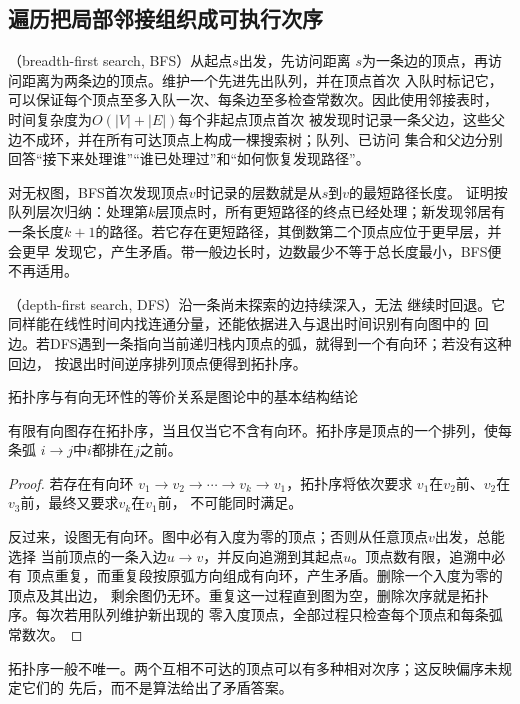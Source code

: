 \subsection{遍历把局部邻接组织成可执行次序}

（breadth-first search, BFS）从起点\(s\)出发，先访问距离
\(s\)为一条边的顶点，再访问距离为两条边的顶点。维护一个先进先出队列，并在顶点首次
入队时标记它，可以保证每个顶点至多入队一次、每条边至多检查常数次。因此使用邻接表时，
时间复杂度为\(O(|V|+|E|)\)每个非起点顶点首次
被发现时记录一条父边，这些父边不成环，并在所有可达顶点上构成一棵搜索树；队列、已访问
集合和父边分别回答“接下来处理谁”“谁已处理过”和“如何恢复发现路径”。

对无权图，BFS首次发现顶点\(v\)时记录的层数就是从\(s\)到\(v\)的最短路径长度。
证明按队列层次归纳：处理第\(k\)层顶点时，所有更短路径的终点已经处理；新发现邻居有
一条长度\(k+1\)的路径。若它存在更短路径，其倒数第二个顶点应位于更早层，并会更早
发现它，产生矛盾。带一般边长时，边数最少不等于总长度最小，BFS便不再适用。

（depth-first search, DFS）沿一条尚未探索的边持续深入，无法
继续时回退。它同样能在线性时间内找连通分量，还能依据进入与退出时间识别有向图中的
回边。若DFS遇到一条指向当前递归栈内顶点的弧，就得到一个有向环；若没有这种回边，
按退出时间逆序排列顶点便得到拓扑序。

拓扑序与有向无环性的等价关系是图论中的基本结构结论
\begin{theorem}[DAG的拓扑排序]
  \label{thm:graph-theory-topological-order}
  有限有向图存在拓扑序，当且仅当它不含有向环。拓扑序是顶点的一个排列，使每条弧
  \(i\to j\)中\(i\)都排在\(j\)之前。
\end{theorem}

\begin{proof}
若存在有向环
\(v_1\to v_2\to\cdots\to v_k\to v_1\)，拓扑序将依次要求
\(v_1\)在\(v_2\)前、\(v_2\)在\(v_3\)前，最终又要求\(v_k\)在\(v_1\)前，
不可能同时满足。

反过来，设图无有向环。图中必有入度为零的顶点；否则从任意顶点\(v\)出发，总能选择
当前顶点的一条入边\(u\to v\)，并反向追溯到其起点\(u\)。顶点数有限，追溯中必有
顶点重复，而重复段按原弧方向组成有向环，产生矛盾。删除一个入度为零的顶点及其出边，
剩余图仍无环。重复这一过程直到图为空，删除次序就是拓扑序。每次若用队列维护新出现的
零入度顶点，全部过程只检查每个顶点和每条弧常数次。
\end{proof}

拓扑序一般不唯一。两个互相不可达的顶点可以有多种相对次序；这反映偏序未规定它们的
先后，而不是算法给出了矛盾答案。

